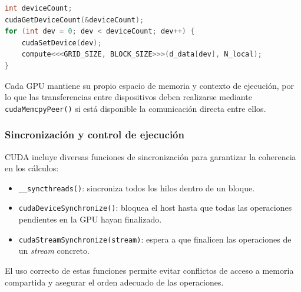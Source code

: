 \begin{lstlisting}[language=C,label={lst:ejemplo_setdevice}]
int deviceCount;
cudaGetDeviceCount(&deviceCount);
for (int dev = 0; dev < deviceCount; dev++) {
    cudaSetDevice(dev);
    compute<<<GRID_SIZE, BLOCK_SIZE>>>(d_data[dev], N_local);
}
\end{lstlisting}

Cada GPU mantiene su propio espacio de memoria y contexto de ejecución, por lo que las transferencias entre dispositivos deben realizarse mediante \texttt{cudaMemcpyPeer()} si está disponible la comunicación directa entre ellos.

\subsubsection{Sincronización y control de ejecución}
CUDA incluye diversas funciones de sincronización para garantizar la coherencia en los cálculos:
\begin{itemize}
    \item \texttt{\_\_syncthreads()}: sincroniza todos los hilos dentro de un bloque.
    \item \texttt{cudaDeviceSynchronize()}: bloquea el host hasta que todas las operaciones pendientes en la GPU hayan finalizado.
    \item \texttt{cudaStreamSynchronize(stream)}: espera a que finalicen las operaciones de un \textit{stream} concreto.
\end{itemize}

El uso correcto de estas funciones permite evitar conflictos de acceso a memoria compartida y asegurar el orden adecuado de las operaciones.


